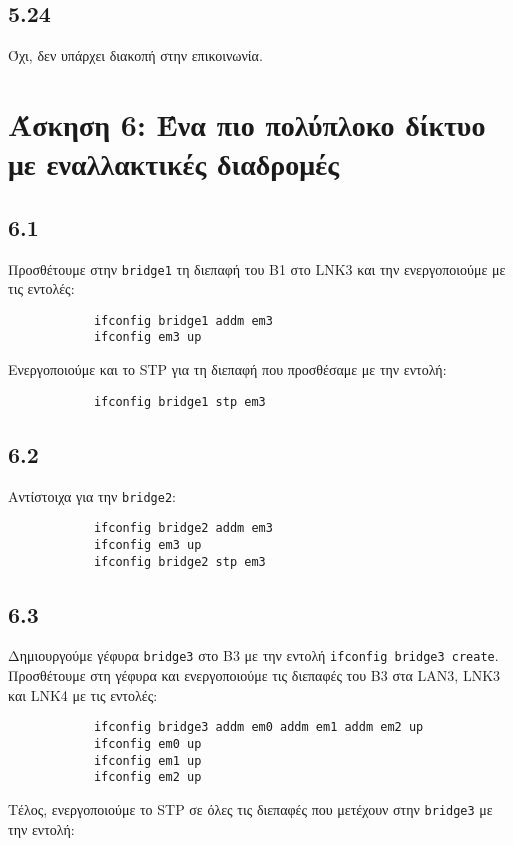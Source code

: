 \documentclass[a4paper, 12pt]{article}
\begin{document}
	\subsection*{5.24}
		Όχι, δεν υπάρχει διακοπή στην επικοινωνία.

\section*{Άσκηση 6: Ένα πιο πολύπλοκο δίκτυο με εναλλακτικές διαδρομές}

	\subsection*{6.1}
		Προσθέτουμε στην \verb|bridge1| τη διεπαφή του B1 στο LNK3 και την ενεργοποιούμε με τις εντολές:
		
		\begin{verbatim}
			ifconfig bridge1 addm em3
			ifconfig em3 up
		\end{verbatim}
		
		Ενεργοποιούμε και το STP για τη διεπαφή που προσθέσαμε με την εντολή:
		
		\begin{verbatim}
			ifconfig bridge1 stp em3
		\end{verbatim}

	\subsection*{6.2}
		Αντίστοιχα για την \verb|bridge2|:
		
		\begin{verbatim}
			ifconfig bridge2 addm em3
			ifconfig em3 up
			ifconfig bridge2 stp em3
		\end{verbatim}

	\subsection*{6.3}
		Δημιουργούμε γέφυρα \verb|bridge3| στο B3 με την εντολή \verb|ifconfig bridge3 create|. Προσθέτουμε στη γέφυρα και ενεργοποιούμε τις διεπαφές του B3 στα LAN3, LNK3 και LNK4 με τις εντολές:
		
		\begin{verbatim}
			ifconfig bridge3 addm em0 addm em1 addm em2 up
			ifconfig em0 up
			ifconfig em1 up
			ifconfig em2 up
		\end{verbatim}
		
		Τέλος, ενεργοποιούμε το STP σε όλες τις διεπαφές που μετέχουν στην \verb|bridge3| με την εντολή:
		
\end{document}
